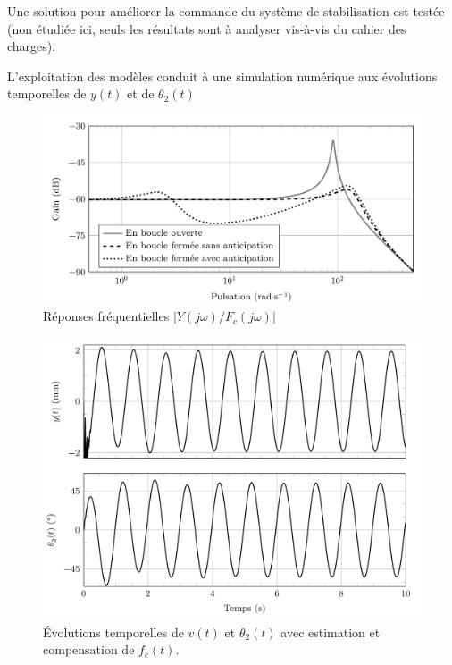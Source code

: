 Une solution pour améliorer la commande du système de stabilisation est testée (non étudiée ici, seuls les résultats sont à analyser vis-à-vis du cahier des charges).

L'exploitation des modèles conduit à une simulation numérique aux évolutions temporelles de $y(t)$ et de $\theta_2(t)$

\begin{figure}[ht]
\begin{center}
\includegraphics[width=0.8\linewidth]{img/fig17}
\caption{Réponses fréquentielles $|Y(j\omega)/F_c(j\omega)|$}
\label{fig17}
\end{center}
\end{figure}

\begin{figure}[ht]
\begin{center}
\includegraphics[width=0.68\linewidth]{img/fig18}
\caption{Évolutions temporelles de $v(t)$ et $\theta_2(t)$ avec estimation et compensation de $f_c(t)$.}
\label{fig18}
\end{center}
\end{figure}


